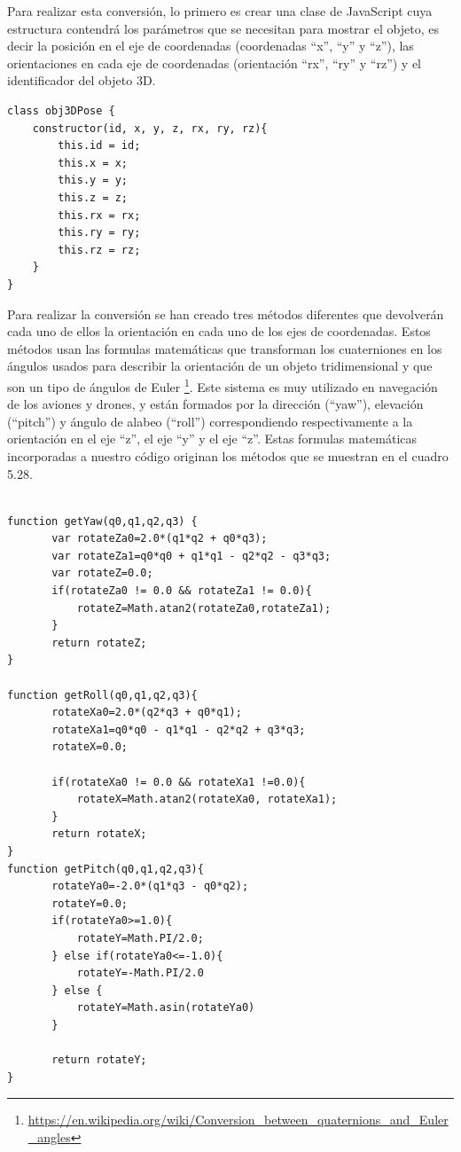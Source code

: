Para realizar esta conversión, lo primero es crear una clase de JavaScript cuya estructura contendrá los parámetros que se necesitan para mostrar el objeto, es decir la posición en el eje de coordenadas (coordenadas ``x'', ``y'' y ``z''), las orientaciones en cada eje de coordenadas (orientación ``rx'', ``ry'' y ``rz'') y el identificador del objeto 3D.
\begin{lstlisting}[caption= Definición de la clase que proporciona la posición de un objeto 3D, label=cod.clasepos]
class obj3DPose {
	constructor(id, x, y, z, rx, ry, rz){
		this.id = id;
		this.x = x;
		this.y = y;
		this.z = z;
		this.rx = rx;
		this.ry = ry;
		this.rz = rz;
	}
}
\end{lstlisting}

Para realizar la conversión se han creado tres métodos diferentes que devolverán cada uno de ellos la orientación en cada uno de los ejes de coordenadas. Estos métodos usan las formulas matemáticas que transforman los cuaterniones en los ángulos usados para describir la orientación de un objeto tridimensional y que son un tipo de ángulos de Euler \footnote{\url{https://en.wikipedia.org/wiki/Conversion_between_quaternions_and_Euler_angles}}. Este sistema es muy utilizado en navegación de los aviones y drones, y están formados por la dirección (``yaw''), elevación (``pitch'') y ángulo de alabeo (``roll'') correspondiendo respectivamente a la orientación en el eje ``z'', el eje ``y'' y el eje ``z''. Estas formulas matemáticas incorporadas a nuestro código originan los métodos que se muestran en el cuadro 5.28.

\begin{lstlisting}[caption= Funciones para realizar la conversión de la orientación, label=cod.conversionpose3d]

function getYaw(q0,q1,q2,q3) {
       var rotateZa0=2.0*(q1*q2 + q0*q3);
       var rotateZa1=q0*q0 + q1*q1 - q2*q2 - q3*q3;
       var rotateZ=0.0;
       if(rotateZa0 != 0.0 && rotateZa1 != 0.0){
           rotateZ=Math.atan2(rotateZa0,rotateZa1);
       }
       return rotateZ;
}

function getRoll(q0,q1,q2,q3){
       rotateXa0=2.0*(q2*q3 + q0*q1);
       rotateXa1=q0*q0 - q1*q1 - q2*q2 + q3*q3;
       rotateX=0.0;

       if(rotateXa0 != 0.0 && rotateXa1 !=0.0){
           rotateX=Math.atan2(rotateXa0, rotateXa1);
       }
       return rotateX;
}
function getPitch(q0,q1,q2,q3){
       rotateYa0=-2.0*(q1*q3 - q0*q2);
       rotateY=0.0;
       if(rotateYa0>=1.0){
           rotateY=Math.PI/2.0;
       } else if(rotateYa0<=-1.0){
           rotateY=-Math.PI/2.0
       } else {
           rotateY=Math.asin(rotateYa0)
       }

       return rotateY;
}
\end{lstlisting}


